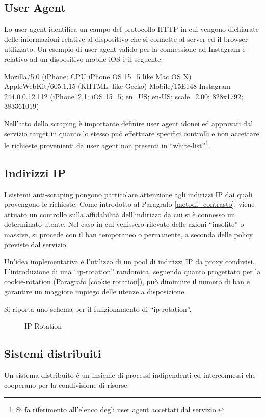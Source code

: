 \subsection{User Agent}
Lo user agent identifica un campo del protocollo HTTP in cui vengono dichiarate delle informazioni relative al dispositivo che si connette al server ed il browser utilizzato.
Un esempio di user agent valido per la connessione ad Instagram e relativo ad un dispositivo mobile iOS \`e il seguente:
\begin{center}
    Mozilla/5.0 (iPhone; CPU iPhone OS 15\_5 like Mac OS X) AppleWebKit/605.1.15 (KHTML, like Gecko) Mobile/15E148 Instagram 244.0.0.12.112 (iPhone12,1; iOS 15\_5; en\_US; en-US; scale=2.00; 828x1792; 383361019)
\end{center}
Nell'atto dello scraping \`e importante definire user agent idonei ed approvati dal servizio target in quanto lo stesso pu\`o effettuare specifici controlli e non accettare le richieste provenienti da user agent non presenti in ``white-list''\footnote{Si fa riferimento all'elenco degli user agent accettati dal servizio.}.
\subsection{Indirizzi IP}\label{ip_rotation}
I sistemi anti-scraping pongono particolare attenzione agli indirizzi IP dai quali provengono le richieste. Come introdotto al Paragrafo \ref{metodi_contrasto}, viene attuato un controllo sulla affidabilit\`a dell'indirizzo da cui si \`e connesso un determinato utente. Nel caso in cui venissero rilevate delle azioni ``insolite'' o massive, si procede con il ban temporaneo o permanente, a seconda delle policy previste dal servizio.

Un'idea implementativa \`e l'utilizzo di un pool di indirizzi IP da proxy condivisi. L'introduzione di una ``ip-rotation'' randomica, seguendo quanto progettato per la cookie-rotation (Paragrafo \ref{cookie rotation}), pu\`o diminuire il numero di ban e garantire un maggiore impiego delle utenze a disposizione.

Si riporta uno schema per il funzionamento di ``ip-rotation''.
\begin{figure}[!htb]
  \begin{center}
  
  \caption{IP Rotation}
\end{center}
\end{figure}
\subsection{Sistemi distribuiti}\label{sistemi_distribuiti}
Un sistema distribuito \`e un insieme di processi indipendenti ed interconnessi che cooperano per la condivisione di risorse. \cite{tanenbaum2007sistemi}

